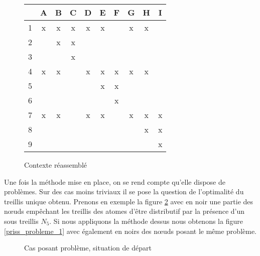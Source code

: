 \begin{figure}[H]
	\begin{minipage}[c]{0.7\textwidth}
	\begin{center}
		\begin{tabular}{ l | c c c c c c c c c }
			& A & B & C & D & E & F & G & H & I \\
			\hline
			1 & x & x & x & x & x & & x & x & \\
			2 & & x & x & & & & & & \\
			3 & & & x & & & & & & \\
			4 & x & x & & x & x & x & x & x & \\
			5 & & & & & x & x & & & \\
			6 & & & & & & x & & & \\
			7 & x & x & & x & x & & x & x & x \\
			8 & & & & & & & & x & x \\
			9 & & & & & & & & & x \\
		\end{tabular}
	\end{center}
	\caption{Contexte réassemblé}
	\label{contexte_reassemble}
	\end{minipage}
\end{figure}

\bigbreak

Une fois la méthode mise en place, on se rend compte qu'elle dispose de problèmes. Sur des cas moins triviaux il se pose la question de l'optimalité du treillis unique obtenu. Prenons en exemple la figure \ref{priss_probleme_base} avec en noir une partie des n\oe uds empêchant les treillis des atomes d'être distributif par la présence d'un sous treillis $N_5$. Si nous appliquons la méthode dessus nous obtenons la figure \ref{priss_probleme_1} avec également en noirs des n\oe uds posant le même problème.

\begin{figure}[H]
	\begin{center}
	\end{center}
	\caption{Cas posant problème, situation de départ}
	\label{priss_probleme_base}
\end{figure}

